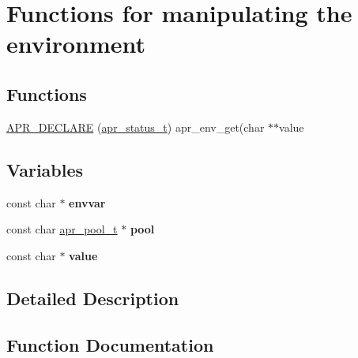\hypertarget{group__apr__env}{}\section{Functions for manipulating the environment}
\label{group__apr__env}
\subsection*{Functions}
\begin{DoxyCompactItemize}
\item 
\mbox{\hyperlink{group__apr__env_ga1fcd8910132f21f9fdee5797ebefa9d1}{A\+P\+R\+\_\+\+D\+E\+C\+L\+A\+RE}} (\mbox{\hyperlink{group__apr__errno_gaf76ee4543247e9fb3f3546203e590a6c}{apr\+\_\+status\+\_\+t}}) apr\+\_\+env\+\_\+get(char $\ast$$\ast$value
\end{DoxyCompactItemize}
\subsection*{Variables}
\begin{DoxyCompactItemize}
\item 
\mbox{\label{group__apr__env_ga933fca1db5dfcd5330db8ef170f35d4b}} 
const char $\ast$ {\bfseries envvar}
\item 
\mbox{\label{group__apr__env_ga35230907c170df5d4d7f0ca99274c574}} 
const char \mbox{\hyperlink{group__apr__pools_gaf137f28edcf9a086cd6bc36c20d7cdfb}{apr\+\_\+pool\+\_\+t}} $\ast$ {\bfseries pool}
\item 
\mbox{\label{group__apr__env_ga8556878012feffc9e0beb86cd78f424d}} 
const char $\ast$ {\bfseries value}
\end{DoxyCompactItemize}


\subsection{Detailed Description}


\subsection{Function Documentation}
\mbox{\label{group__apr__env_ga1fcd8910132f21f9fdee5797ebefa9d1}} 
